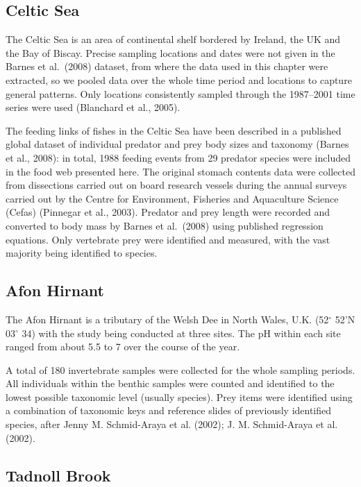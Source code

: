 \documentclass{article}
\begin{document}
\hypertarget{celtic-sea}{%
\subsection{Celtic Sea}\label{celtic-sea}}

The Celtic Sea is an area of continental shelf bordered by Ireland, the
UK and the Bay of Biscay. Precise sampling locations and dates were not
given in the Barnes et al.~(2008) dataset, from where the data used in
this chapter were extracted, so we pooled data over the whole time
period and locations to capture general patterns. Only locations
consistently sampled through the 1987--2001 time series were used
(Blanchard et al., 2005).

The feeding links of fishes in the Celtic Sea have been described in a
published global dataset of individual predator and prey body sizes and
taxonomy (Barnes et al., 2008): in total, 1988 feeding events from 29
predator species were included in the food web presented here. The
original stomach contents data were collected from dissections carried
out on board research vessels during the annual surveys carried out by
the Centre for Environment, Fisheries and Aquaculture Science (Cefas)
(Pinnegar et al., 2003). Predator and prey length were recorded and
converted to body mass by Barnes et al.~(2008) using published
regression equations. Only vertebrate prey were identified and measured,
with the vast majority being identified to species.

\hypertarget{afon-hirnant}{%
\subsection{Afon Hirnant}\label{afon-hirnant}}

The Afon Hirnant is a tributary of the Welsh Dee in North Wales, U.K.
(52\(^\circ\) 52'N 03\(^\circ\) 34) with the study being conducted at
three sites. The pH within each site ranged from about 5.5 to 7 over the
course of the year.

A total of 180 invertebrate samples were collected for the whole
sampling periods. All individuals within the benthic samples were
counted and identified to the lowest possible taxonomic level (usually
species). Prey items were identified using a combination of taxonomic
keys and reference slides of previously identified species, after Jenny
M. Schmid-Araya et al. (2002); J. M. Schmid-Araya et al. (2002).

\hypertarget{tadnoll-brook}{%
\subsection{Tadnoll Brook}\label{tadnoll-brook}}
\end{document}
